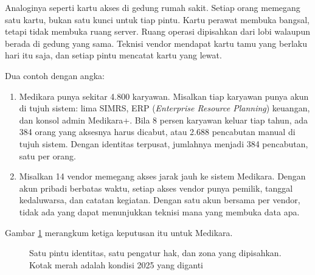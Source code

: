 Analoginya seperti kartu akses di gedung rumah sakit. Setiap orang memegang
satu kartu, bukan satu kunci untuk tiap pintu. Kartu perawat membuka bangsal,
tetapi tidak membuka ruang server. Ruang operasi dipisahkan dari lobi walaupun
berada di gedung yang sama. Teknisi vendor mendapat kartu tamu yang berlaku
hari itu saja, dan setiap pintu mencatat kartu yang lewat.

Dua contoh dengan angka:

\begin{enumerate}
  \item Medikara punya sekitar 4.800 karyawan. Misalkan tiap karyawan punya
        akun di tujuh sistem: lima SIMRS, ERP (\textit{Enterprise Resource
        Planning}) keuangan, dan konsol admin Medikara+. Bila 8 persen
        karyawan keluar tiap tahun, ada 384 orang yang aksesnya harus
        dicabut, atau 2.688 pencabutan manual di tujuh sistem. Dengan
        identitas terpusat, jumlahnya menjadi 384 pencabutan, satu per orang.
  \item Misalkan 14 vendor memegang akses jarak jauh ke sistem Medikara.
        Dengan akun pribadi berbatas waktu, setiap akses vendor punya pemilik,
        tanggal kedaluwarsa, dan catatan kegiatan. Dengan satu akun bersama
        per vendor, tidak ada yang dapat menunjukkan teknisi mana yang
        membuka data apa.
\end{enumerate}

Gambar \ref{fig:ch10-zona-keamanan} merangkum ketiga keputusan itu untuk
Medikara.

\begin{figure}[!htb]
  \centering
  
  \caption{Satu pintu identitas, satu pengatur hak, dan zona yang dipisahkan.
           Kotak merah adalah kondisi 2025 yang diganti}
  \label{fig:ch10-zona-keamanan}
\end{figure}

